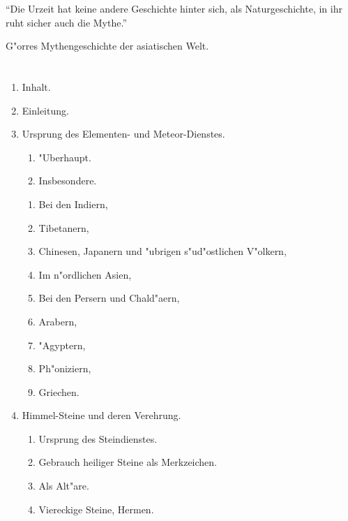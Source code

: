 \documentclass[a4paper, 11pt, oneside, polutonikogreek, german]{article}
\begin{document}
\setlength{\parskip}{1mm plus1mm minus1mm}
\clearpage
\LARGE
\pagestyle{fancy}
\fancyhf{}
\cfoot{\frakfamily{\thepage}}
\vspace*{\fill}
\begin{center}
"`Die Urzeit hat keine andere Geschichte hinter sich, als Naturgeschichte, in ihr ruht sicher auch die Mythe."'
\end{center}
\begin{center}
G"orres Mythengeschichte der asiatischen Welt.
\end{center}
\vspace*{\fill}
\clearpage
\section*{\Huge{}}
\begin{enumerate}
    \item[] Inhalt.
    \item[] Einleitung.
    \item Ursprung des Elementen- und Meteor-Dienstes.
    \begin{enumerate}
        \item "Uberhaupt.
        \item Insbesondere.
    \end{enumerate}
    \begin{enumerate}
        \item Bei den Indiern,
        \item Tibetanern,
        \item Chinesen, Japanern und "ubrigen s"ud"ostlichen V"olkern,
        \item Im n"ordlichen Asien,
        \item Bei den Persern und Chald"aern,
        \item Arabern,
        \item "Agyptern,
        \item Ph"oniziern,
        \item Griechen.
    \end{enumerate}
    \item Himmel-Steine und deren Verehrung.
    \begin{enumerate}
        \item Ursprung des Steindienstes.
        \item Gebrauch heiliger Steine als Merkzeichen.
        \item Als Alt"are.
        \item Viereckige Steine, Hermen.

\end{enumerate}
\end{enumerate}
\end{document}
